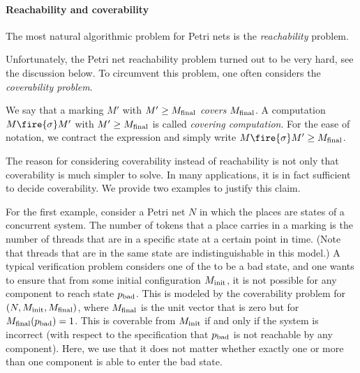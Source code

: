 \documentclass[../../diss.tex]{subfiles}
\begin{document}
\paragraph{Reachability and coverability}

The most natural algorithmic problem for Petri nets is the \emph{reachability} problem.

\begin{problem}
    \problemshort{($\PNREACH$)}
\end{problem}

Unfortunately, the Petri net reachability problem turned out to be very hard, see the discussion below.
To circumvent this problem, one often considers the \emph{coverability problem}.

\begin{problem}
    \problemshort{($\PNCOV$)}
\end{problem}


We say that a marking $M'$ with $M' \geq M_{\text{final}}$ \emph{covers} $M_{\text{final}}$.
A computation $M \fire{\sigma} M'$ with $M' \geq M_{\text{final}}$ is called \emph{covering computation}.
For the ease of notation, we contract the expression and simply write $M \fire{\sigma} M' \geq \Mfinal$.

The reason for considering coverability instead of reachability is not only that coverability is much simpler to solve.
In many applications, it is in fact sufficient to decide coverability.
We provide two examples to justify this claim.

For the first example, consider a Petri net $N$ in which the places are states of a concurrent system.
The number of tokens that a place carries in a marking is the number of threads that are in a specific state at a certain point in time.
(Note that threads that are in the same state are indistinguishable in this model.)
A typical verification problem considers one of the  to be a bad state, and one wants to ensure that from some initial configuration $M_{\text{init}}$, it is not possible for any component to reach state $p_{\text{bad}}$.
This is modeled by the coverability problem for $(N,M_{\text{init}},M_{\text{final}})$, where $M_{\text{final}}$ is the unit vector that is zero but for $M_{\text{final}}(p_{\text{bad}}) = 1$.
This  is coverable from $M_{\text{init}}$ if and only if the system is incorrect (with respect to the specification that $p_{\text{bad}}$ is not reachable by any component).
Here, we use that it does not matter whether exactly one or more than one component is able to enter the bad state.
\end{document}
